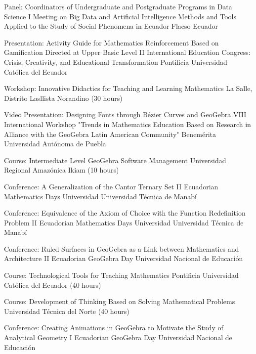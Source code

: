 \documentclass[
    a4paper,
    maincolor=cvblue!70!blue,
    sidecolor=gray!30,
    sectioncolor=cvblue!70!blue,
    sidebarwidth=7.5cm,
    topbottommargin=20pt,
    leftrightmargin=20pt,
]{fortysecondscv}
\begin{document}
    
    {Panel: Coordinators of Undergraduate and Postgraduate Programs in Data Science}
    {I Meeting on Big Data and Artificial Intelligence Methods and Tools Applied to the Study of Social Phenomena in Ecuador}
    {Flacso Ecuador}
    
    {Presentation: Activity Guide for Mathematics Reinforcement Based on Gamification Directed at Upper Basic Level}
    {II International Education Congress: Crisis, Creativity, and Educational Transformation}
    {Pontificia Universidad Católica del Ecuador}
    
    {Workshop: Innovative Didactics for Teaching and Learning Mathematics}
    {}
    {La Salle, Distrito Lasllista Norandino (30 hours)}
    
    {Video Presentation: Designing Fonts through Bézier Curves and GeoGebra}
    {VIII International Workshop "Trends in Mathematics Education Based on Research in Alliance with the GeoGebra Latin American Community"}
    {Benemérita Universidad Autónoma de Puebla}
    

    {Course: Intermediate Level GeoGebra Software Management}
    {}
    {Universidad Regional Amazónica Ikiam (10 hours)}
    
    {Conference: A Generalization of the Cantor Ternary Set}
    {II Ecuadorian Mathematics Days}
    {Universidad Universidad Técnica de Manabí}
    

    {Conference: Equivalence of the Axiom of Choice with the Function Redefinition Problem}
    {II Ecuadorian Mathematics Days}
    {Universidad Universidad Técnica de Manabí}
    
    {Conference: Ruled Surfaces in GeoGebra as a Link between Mathematics and Architecture}
    {II Ecuadorian GeoGebra Day}
    {Universidad Nacional de Educación}
    

    {Course: Technological Tools for Teaching Mathematics}
    {}
    {Pontificia Universidad Católica del Ecuador (40 hours)}
    

    {Course: Development of Thinking Based on Solving Mathematical Problems}
    {}
    {Universidad Técnica del Norte (40 hours)}
    
    {Conference: Creating Animations in GeoGebra to Motivate the Study of Analytical Geometry}
    {I Ecuadorian GeoGebra Day}
    {Universidad Nacional de Educación}
    
\end{document}
